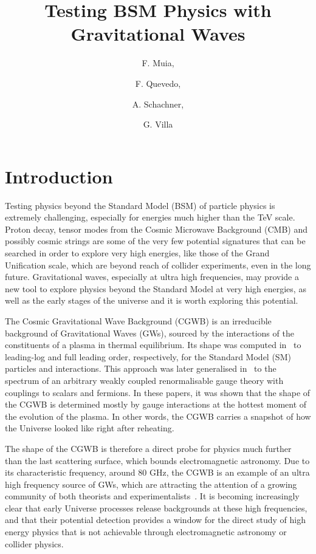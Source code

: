 \documentclass[a4paper,11pt]{article}
\title{Testing BSM Physics with  Gravitational Waves}
\author[a]{F. Muia,}
\author[a]{F. Quevedo,}
\author[b]{A. Schachner,}
\author[a]{G. Villa}
\affiliation[a]{\footnotesize DAMTP,  Centre for Mathematical Sciences,  University of Cambridge, Wilberforce Road,  Cambridge, CB3 0WA, UK}
\affiliation[b]{\footnotesize Department of Physics, Cornell University, Ithaca, NY 14853, USA}
\begin{document}
 
\maketitle
\flushbottom

\section{Introduction}
\label{sec:Intro}

Testing physics beyond the Standard Model (BSM) of particle physics is extremely challenging, especially for energies much higher than the TeV scale. Proton decay, tensor modes from the Cosmic Microwave Background (CMB) and possibly cosmic strings are  some of the very few potential signatures that can be searched in order to explore very high energies, like those of the Grand Unification scale, which are beyond reach of collider experiments, even in the long future. Gravitational waves, especially at ultra high frequencies, may provide a new tool to explore physics beyond the Standard Model at very high energies, as well as the early stages of the universe and it is worth exploring this potential.\vspace{0.1cm}


The Cosmic Gravitational Wave Background (CGWB) is an irreducible background of Gravitational Waves (GWs), sourced by the interactions of the constituents of a plasma in thermal equilibrium. Its shape was computed in~\cite{Ghiglieri:2015nfa,Ghiglieri:2020mhm} to leading-log and full leading order, respectively, for the Standard Model (SM) particles and interactions. This approach was later generalised in~\cite{Ringwald:2020ist} to the spectrum of an arbitrary weakly coupled renormalisable gauge theory with couplings to scalars and fermions. In these papers, it was shown that the shape of the CGWB is determined mostly by gauge interactions at the hottest moment of the evolution of the plasma. In other words, the CGWB carries a snapshot of how the Universe looked like right after reheating. \vspace{0.1cm}

The shape of the CGWB is therefore a direct probe for physics much further than the last scattering surface, which bounds electromagnetic astronomy. Due to its characteristic frequency, around $80$ GHz, the CGWB is an example of an ultra high frequency source of GWs, which are attracting the attention of a growing community of both theorists and experimentalists~\cite{Aggarwal:2020olq}. It is becoming increasingly clear that early Universe processes release backgrounds at these high frequencies, and that their potential detection provides a window for the direct study of high energy physics that is not achievable through electromagnetic astronomy or collider physics. \vspace{0.1cm}
\end{document}
